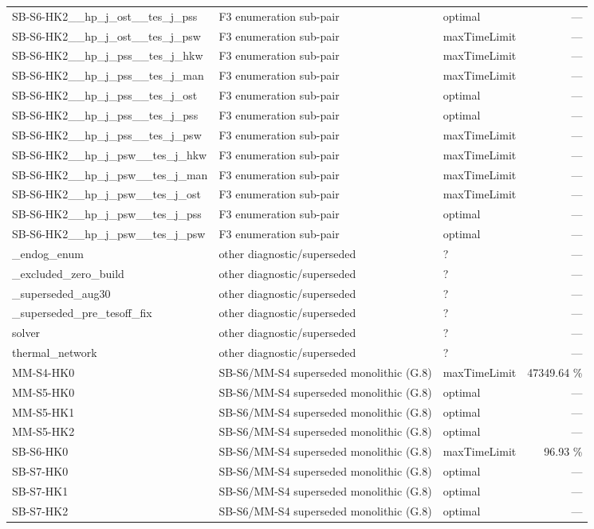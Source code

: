 \begin{table}[htbp]
\begin{tabular}{lllr}
  SB-S6-HK2\_\_hp\_j\_ost\_\_tes\_j\_pss & F3 enumeration sub-pair & optimal & — \\
  SB-S6-HK2\_\_hp\_j\_ost\_\_tes\_j\_psw & F3 enumeration sub-pair & maxTimeLimit & — \\
  SB-S6-HK2\_\_hp\_j\_pss\_\_tes\_j\_hkw & F3 enumeration sub-pair & maxTimeLimit & — \\
  SB-S6-HK2\_\_hp\_j\_pss\_\_tes\_j\_man & F3 enumeration sub-pair & maxTimeLimit & — \\
  SB-S6-HK2\_\_hp\_j\_pss\_\_tes\_j\_ost & F3 enumeration sub-pair & optimal & — \\
  SB-S6-HK2\_\_hp\_j\_pss\_\_tes\_j\_pss & F3 enumeration sub-pair & optimal & — \\
  SB-S6-HK2\_\_hp\_j\_pss\_\_tes\_j\_psw & F3 enumeration sub-pair & maxTimeLimit & — \\
  SB-S6-HK2\_\_hp\_j\_psw\_\_tes\_j\_hkw & F3 enumeration sub-pair & maxTimeLimit & — \\
  SB-S6-HK2\_\_hp\_j\_psw\_\_tes\_j\_man & F3 enumeration sub-pair & maxTimeLimit & — \\
  SB-S6-HK2\_\_hp\_j\_psw\_\_tes\_j\_ost & F3 enumeration sub-pair & maxTimeLimit & — \\
  SB-S6-HK2\_\_hp\_j\_psw\_\_tes\_j\_pss & F3 enumeration sub-pair & optimal & — \\
  SB-S6-HK2\_\_hp\_j\_psw\_\_tes\_j\_psw & F3 enumeration sub-pair & optimal & — \\
  \_endog\_enum & other diagnostic/superseded & ? & — \\
  \_excluded\_zero\_build & other diagnostic/superseded & ? & — \\
  \_superseded\_aug30 & other diagnostic/superseded & ? & — \\
  \_superseded\_pre\_tesoff\_fix & other diagnostic/superseded & ? & — \\
  solver & other diagnostic/superseded & ? & — \\
  thermal\_network & other diagnostic/superseded & ? & — \\
  MM-S4-HK0 & SB-S6/MM-S4 superseded monolithic (G.8) & maxTimeLimit & 47349.64 \% \\
  MM-S5-HK0 & SB-S6/MM-S4 superseded monolithic (G.8) & optimal & — \\
  MM-S5-HK1 & SB-S6/MM-S4 superseded monolithic (G.8) & optimal & — \\
  MM-S5-HK2 & SB-S6/MM-S4 superseded monolithic (G.8) & optimal & — \\
  SB-S6-HK0 & SB-S6/MM-S4 superseded monolithic (G.8) & maxTimeLimit & 96.93 \% \\
  SB-S7-HK0 & SB-S6/MM-S4 superseded monolithic (G.8) & optimal & — \\
  SB-S7-HK1 & SB-S6/MM-S4 superseded monolithic (G.8) & optimal & — \\
  SB-S7-HK2 & SB-S6/MM-S4 superseded monolithic (G.8) & optimal & — \\
  \bottomrule
  \end{tabular}
\end{table}
